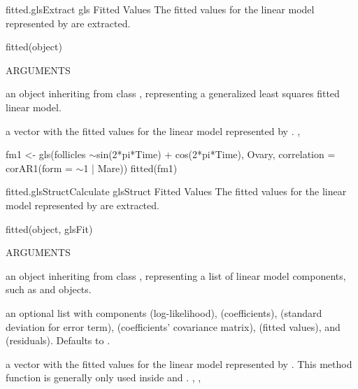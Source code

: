 \documentclass[pdftex]{article} \usepackage{url,graphicx}
\renewcommand{\Twiddle}{\mbox{\(\sim\)}}
\begin{document}
\begin{Helpfile}{fitted.gls}{Extract gls Fitted Values}
The fitted values for the linear model represented by 
are extracted.
\begin{Example}
fitted(object)
\end{Example}
\begin{Argument}{ARGUMENTS}
\item[\Co{object:}]
an object inheriting from class , representing
a generalized least squares fitted linear model.
\end{Argument}
a vector with the fitted values for the linear model represented by
.
, 
\need 15pt
\vspace{-16pt} 
\begin{Example}
fm1 <- gls(follicles \Twiddle sin(2*pi*Time) + cos(2*pi*Time), Ovary,
           correlation = corAR1(form = \Twiddle 1 | Mare))
fitted(fm1)
\end{Example}
\end{Helpfile}
\begin{Helpfile}{fitted.glsStruct}{Calculate glsStruct Fitted Values}
The fitted values for the linear model represented by 
are extracted.
\begin{Example}
fitted(object, glsFit)
\end{Example}
\begin{Argument}{ARGUMENTS}
\item[\Co{object:}]
an object inheriting from class ,
representing a list of linear model components, such as
 and  objects.
\item[\Co{glsFit:}]
an optional list with components 
(log-likelihood),  (coefficients),  (standard
deviation for error term),  (coefficients' covariance
matrix),  (fitted values), and 
(residuals). Defaults to .
\end{Argument}
a vector with the fitted values for the linear model represented by
.
 This method function is generally only used inside  and 
.
, ,
\end{Helpfile}
\end{document}
